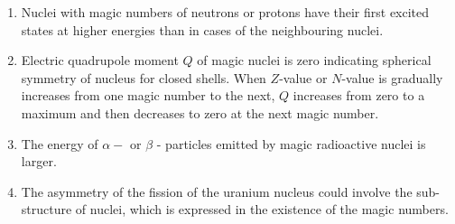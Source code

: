 \begin{enumerate}
	\item Nuclei with magic numbers of neutrons or protons have their first excited states at higher energies than in cases of the neighbouring nuclei.
	\item Electric quadrupole moment $Q$ of magic nuclei is zero indicating spherical symmetry of nucleus for closed shells. When $Z$-value or $N$-value is gradually increases from one magic number to the next, $Q$ increases from zero to a maximum and then decreases to zero at the next magic number.
	\item The energy of $\alpha-$ or $\beta$ - particles emitted by magic radioactive nuclei is larger.
	\item The asymmetry of the fission of the uranium nucleus could involve the sub-structure of nuclei, which is expressed in the existence of the magic numbers.
\end{enumerate}
